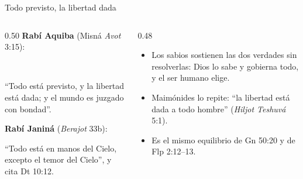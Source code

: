 \begin{frame}{Todo previsto, la libertad dada}
\begin{columns}[t,onlytextwidth]
\begin{column}{0.50\textwidth}\small
\textbf{Rabí Aquiba} (Misná \emph{Avot} 3:15):
\begin{center}\\ \end{center}
``Todo está previsto, y la libertad está dada; y el mundo es juzgado con bondad''.\par\medskip
\textbf{Rabí Janiná} (\emph{Berajot} 33b):
\begin{center}\end{center}
``Todo está en manos del Cielo, excepto el temor del Cielo'', y cita Dt 10:12.
\end{column}
\begin{column}{0.48\textwidth}\small
\begin{itemize}
\item Los sabios sostienen las dos verdades sin resolverlas: Dios lo sabe y gobierna todo, y el ser humano elige.
\item Maimónides lo repite: ``la libertad está dada a todo hombre'' (\emph{Hiljot Teshuvá} 5:1).
\item Es el mismo equilibrio de Gn 50:20 y de Flp 2:12--13.
\end{itemize}
\end{column}
\end{columns}
\end{frame}

